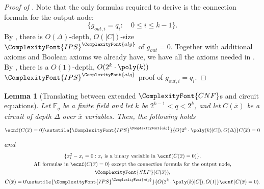 \documentclass[11pt,letter]{article}
\newtheorem{lemma}[theorem]{Lemma}
\theoremstyle{remark} %
\newcommand{\alg}{\ComplexityFont{alg}}
\newcommand{\IPS}{%
    {
        \ComplexityFont{IPS} 
    }
}
\newcommand{\CNF}{ %
    {
        \ComplexityFont{CNF}
    }
}
\newcommand{\SLP}{ %
    {
        \ComplexityFont{SLP}
    }
}
\newcommand{\cd}{ %
    {
        \ComplexityFont{c.d.}
    }
}
\newcommand{\F}{\mathbb{F}}
\begin{document}
{    \begin{proof}[Proof of ]

        Note that the only formulas required to derive is the connection formula for the output node:
        \[
            \{g_{out, i} = q_i: \quad  0\leq i \leq k-1\}.
        \]
        By , there is $O(\Delta)$-depth, $O(|C|)$-size $\IPS^\alg$ of $g_{out}=0$. Together with additional axioms and Boolean axioms we already have, we have all the axioms needed in . By , there is a $O(1)$-depth, $O(2^k\cdot \poly(k))$ $\IPS^\alg$ proof of $g_{out,i} =q_i$.
    \end{proof}


    \begin{lemma}[Translating between extended $\CNF$s and circuit equations] 
        \label{lemma: Translating between extended CNF formulas and circuit equations}
        Let $\F_q$ be a finite field and let $k$ be $2^{k-1} < q < 2^k$, and let $C(\overline{x})$ be a circuit of depth $\Delta$ over $\overline{x}$ variables. Then, the following holds
        \begin{align*}
            \ecnf(C(\overline{x})=0) \sststile{\IPS^\alg}{O(2^k \cdot \poly(k)|C|),O(\Delta)} C(\overline{x})=0  
        \end{align*} and
        \begin{gather*}
            \{x_i^2-x_i =0: x_i \text{ is a binary variable in }\ecnf(C(\overline{x})=0)\}, \\
            \text{All formulas in }\ecnf(C(\overline{x})=0) \text{ except the connection formula for the output node},\\
            \SLP(C(\overline{x})),\\
            C(\overline{x})=0 \sststile{\IPS^\alg}{O(2^k\cdot \poly(k)|C|),O(1)} \ecnf(C(\overline{x})=0) .
        \end{gather*}
    \end{lemma}
    
  
    


}
\end{document}
